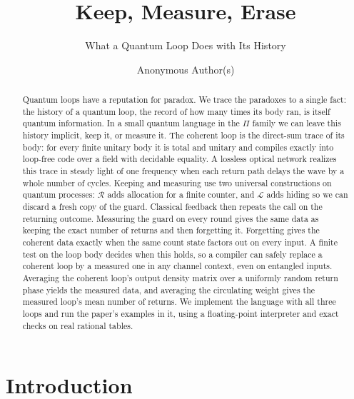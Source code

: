 \documentclass[acmsmall,screen,review,anonymous,nonacm]{acmart}
\numberwithin{equation}{section}
\begin{document}
\title{Keep, Measure, Erase}
\subtitle{What a Quantum Loop Does with Its History}
\author{Anonymous Author(s)}
\affiliation{\institution{}\city{}\country{}}
\begin{abstract}
Quantum loops have a reputation for paradox. We trace the paradoxes to
a single fact: the history of a quantum loop, the record of how many
times its body ran, is itself quantum information. In a small quantum language in the $\Pi$ family we can leave this history implicit, keep it, or measure it. The coherent loop is the direct-sum trace of its body:
for every finite unitary body it is total and unitary and compiles exactly
into loop-free code over a field with decidable equality. A lossless optical network realizes this trace in steady light of one frequency
when each return path delays the wave by a whole number of cycles.
Keeping and measuring use two universal constructions on quantum processes:
$\mathcal R$ adds allocation for a finite counter, and $\mathcal L$ adds hiding
so we can discard a fresh copy of the guard. Classical feedback then repeats the call on the returning outcome. Measuring the guard on every round gives the
same data as keeping the exact number of returns and then forgetting it.
Forgetting gives the coherent data exactly when the same count state
factors out on every input. A finite test on the loop body decides when this holds, so a compiler
can safely replace a coherent loop by a measured one in any channel context, even on entangled inputs. Averaging the coherent loop's output density matrix over a uniformly random return phase
yields the measured data, and averaging the circulating weight gives the measured loop's mean number of returns.
We implement the language with all three loops and run the paper's examples in it,
using a floating-point interpreter and exact checks on real rational tables.
\end{abstract}
\maketitle
\hypersetup{citecolor=ink,linkcolor=ink,urlcolor=muted}

\section{Introduction}
\end{document}
